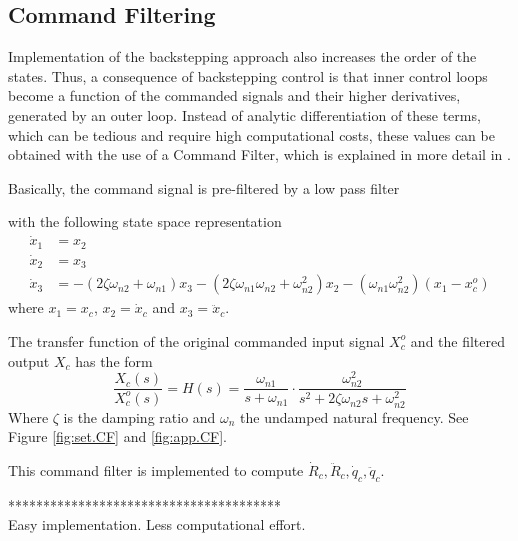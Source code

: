 \subsection{Command Filtering}
Implementation of the backstepping approach also increases the order of the states. Thus, a consequence of backstepping control is that inner control loops become a function of the commanded signals and their higher derivatives, generated by an outer loop.
Instead of analytic differentiation of these terms, which can be tedious and require high computational costs, these values can be obtained with the use of a Command Filter, which is explained in more detail in \cite{Farrell2008}.

Basically, the command signal is pre-filtered by a low pass filter 

with the following state space representation
\begin{align}\label{key}
\dot{x}_1 &= x_2\\ %
\dot{x}_2 &= x_3\\ %
\dot{x}_3 &= -(2\zeta \omega_{n2}+\omega_{n1})x_3-(2\zeta\omega_{n1}\omega_{n2}+\omega_{n2}^2)x_2-(\omega_{n1}\omega_{n2}^2)(x_1-x_c^o)
\end{align}
where $ x_1 = x_c$, $ x_2 = \dot{x}_c$ and $ x_3 = \ddot{x}_c$. 

The transfer function of the original commanded input signal $ X_c^o $ and the filtered output $ X_c $ has the form
\begin{equation}\label{key}
\frac{X_c(s)}{X_c^o(s)}=H(s)=\frac{\omega_{n1}}{s+\omega_{n1}}\cdot\frac{\omega_{n2}^2}{s^2+2\zeta\omega_{n2}s+\omega_{n2}^2}
\end{equation}
Where $ \zeta $ is the damping ratio and $ \omega_n $ the undamped natural frequency. See Figure \ref{fig:set.CF} and \ref{fig:app.CF}.

This command filter is implemented to compute $ \dot{R}_c, \ddot{R}_c,\dot{q}_c, \ddot{q}_c $.
%


***************************************\\
Easy implementation. Less computational effort.

